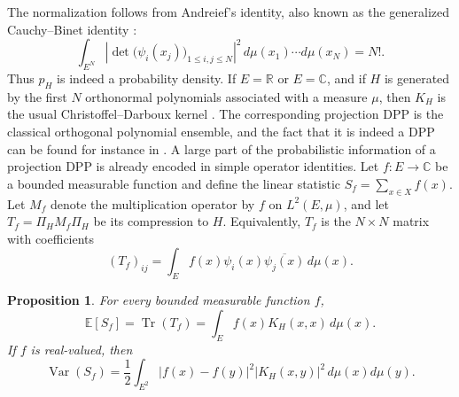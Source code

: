 \documentclass[12pt,a4paper,reqno]{article}
\theoremstyle{thmstyleone}
\newtheorem{proposition}[theorem]{Proposition}
\theoremstyle{thmstylethree}
\theoremstyle{thmstyletwo}
\numberwithin{equation}{subsection}
\def\leq{\leqslant}
\begin{document}
The normalization follows from Andreief's identity, also known as the generalized Cauchy--Binet identity \cite[Prop. 2.10]{Joh}:
\[
    \int_{E^N}\left|\det\big(\psi_i(x_j)\big)_{1\leq i,j\leq N}\right|^2\,d\mu(x_1)\cdots d\mu(x_N)=N!.
\]
Thus $p_H$ is indeed a probability density. If $E=\mathbb R$ or $E=\mathbb C$, and if $H$ is generated by the first $N$ orthonormal polynomials associated with a measure $\mu$, then $K_H$ is the usual Christoffel--Darboux kernel \cite{Dei}. The corresponding projection DPP is the classical orthogonal polynomial ensemble, and the fact that it is indeed a DPP can be found for instance in \cite{Bor,BS}. A large part of the probabilistic information of a projection DPP is already encoded in simple operator identities. Let $f:E\to\mathbb C$ be a bounded measurable function and define the linear statistic $S_f=\sum_{x\in X} f(x).$ Let $M_f$ denote the multiplication operator by $f$ on $L^2(E,\mu)$, and let $T_f=\Pi_H M_f \Pi_H$ be its compression to $H$. Equivalently, $T_f$ is the $N\times N$ matrix with coefficients
\[
    (T_f)_{ij}=\int_E f(x)\psi_i(x)\overline{\psi_j(x)}\,d\mu(x).
\]

\begin{proposition}\label{prop:linear-statistics-projection-DPP}
For every bounded measurable function $f$,
\begin{equation}
\mathbb E[S_f]=\operatorname{Tr}(T_f)=\int_E f(x)K_H(x,x)\,d\mu(x).
\end{equation}
If $f$ is real-valued, then
\begin{equation}\label{eq:variance-dpp}
\operatorname{Var}(S_f)=\frac12\int_{E^2}|f(x)-f(y)|^2|K_H(x,y)|^2\,d\mu(x)d\mu(y).
\end{equation}
\end{proposition}

\end{document}
